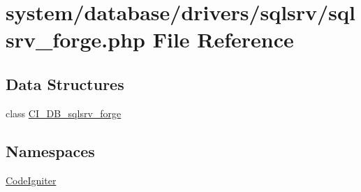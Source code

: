 \hypertarget{sqlsrv__forge_8php}{\section{system/database/drivers/sqlsrv/sqlsrv\-\_\-forge.php File Reference}
\label{sqlsrv__forge_8php}
}
\subsection*{Data Structures}
\begin{DoxyCompactItemize}
\item 
class \hyperlink{class_c_i___d_b__sqlsrv__forge}{C\-I\-\_\-\-D\-B\-\_\-sqlsrv\-\_\-forge}
\end{DoxyCompactItemize}
\subsection*{Namespaces}
\begin{DoxyCompactItemize}
\item 
\hyperlink{namespace_code_igniter}{Code\-Igniter}
\end{DoxyCompactItemize}
